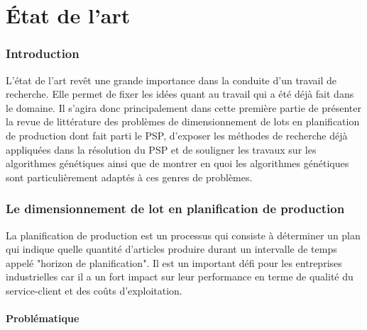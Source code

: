 \documentclass[12pt,a4paper]{article}
\begin{document}
	\newpage
	
	\part{État de l'art}
	\section*{Introduction}
		
		L'état de l'art revêt une grande importance dans la conduite d'un travail de recherche. Elle permet de fixer les idées quant au travail qui a été déjà fait dans le domaine. Il s'agira donc principalement dans cette première partie de présenter la revue de littérature des problèmes de dimensionnement de lots en planification de production dont fait parti le PSP, d'exposer les méthodes de recherche déjà appliquées dans la résolution du PSP et de souligner les travaux sur les algorithmes génétiques ainsi que de montrer en quoi les algorithmes génétiques sont particulièrement adaptés à ces genres de problèmes.
		
	\section{Le dimensionnement de lot en planification de production}
	La planification de production est un processus qui consiste à déterminer un plan qui indique quelle quantité d'articles produire durant un intervalle de temps appelé "horizon de planification". Il est un important défi pour les entreprises industrielles car il a un fort impact sur leur performance en terme de qualité du service-client et des coûts d'exploitation.	
	
	\subsection{Problématique}
		
\end{document}
